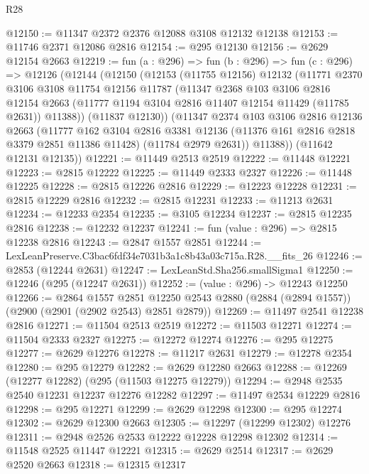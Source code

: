 \begin{lexlean}{R28}
\begin{coremodule}
@12150 := @11347 @2372 @2376 @12088 @3108 @12132 @12138
@12153 := @11746 @2371 @12086 @2816
@12154 := @295 @12130
@12156 := @2629 @12154 @2663
@12219 := fun (a : @296) =>
  fun (b : @296) =>
  fun (c : @296) =>
  @12126
    (@12144
      (@12150
        (@12153
          (@11755 @12156)
          @12132
          (@11771
            @2370
            @3106
            @3108
            @11754
            @12156
            @11787
            (@11347
              @2368
              @103
              @3106
              @2816
              @12154
              @2663
              (@11777 @1194 @3104 @2816 @11407 @12154 @11429 (@11785 @2631))
              @11388))
          (@11837 @12130))
        (@11347
          @2374
          @103
          @3106
          @2816
          @12136
          @2663
          (@11777
            @162
            @3104
            @2816
            @3381
            @12136
            (@11376 @161 @2816 @2818 @3379 @2851 @11386 @11428)
            (@11784 @2979 @2631))
          @11388))
      (@11642 @12131 @12135))
@12221 := @11449 @2513 @2519
@12222 := @11448 @12221
@12223 := @2815 @12222
@12225 := @11449 @2333 @2327
@12226 := @11448 @12225
@12228 := @2815 @12226 @2816
@12229 := @12223 @12228
@12231 := @2815 @12229 @2816
@12232 := @2815 @12231
@12233 := @11213 @2631
@12234 := @12233 @2354
@12235 := @3105 @12234
@12237 := @2815 @12235 @2816
@12238 := @12232 @12237
@12241 := fun (value : @296) => @2815 @12238 @2816
@12243 := @2847 @1557 @2851
@12244 := LexLeanPreserve.C3bac6fdf34e7031b3a1c8b43a03c715a.R28.__fits_26
@12246 := @2853 (@12244 @2631)
@12247 := LexLeanStd.Sha256.smallSigma1
@12250 := @12246 (@295 (@12247 @2631))
@12252 := (value : @296) -> @12243 @12250
@12266 := @2864
    @1557
    @2851
    @12250
    @2543
    @2880
    (@2884 (@2894 @1557))
    (@2900 (@2901 (@2902 @2543) @2851 @2879))
@12269 := @11497 @2541 @12238 @2816
@12271 := @11504 @2513 @2519
@12272 := @11503 @12271
@12274 := @11504 @2333 @2327
@12275 := @12272 @12274
@12276 := @295 @12275
@12277 := @2629 @12276
@12278 := @11217 @2631
@12279 := @12278 @2354
@12280 := @295 @12279
@12282 := @2629 @12280 @2663
@12288 := @12269 (@12277 @12282) (@295 (@11503 @12275 @12279))
@12294 := @2948 @2535 @2540 @12231 @12237 @12276 @12282
@12297 := @11497 @2534 @12229 @2816
@12298 := @295 @12271
@12299 := @2629 @12298
@12300 := @295 @12274
@12302 := @2629 @12300 @2663
@12305 := @12297 (@12299 @12302) @12276
@12311 := @2948 @2526 @2533 @12222 @12228 @12298 @12302
@12314 := @11548 @2525 @11447 @12221
@12315 := @2629 @2514
@12317 := @2629 @2520 @2663
@12318 := @12315 @12317

\end{coremodule}
\end{lexlean}
